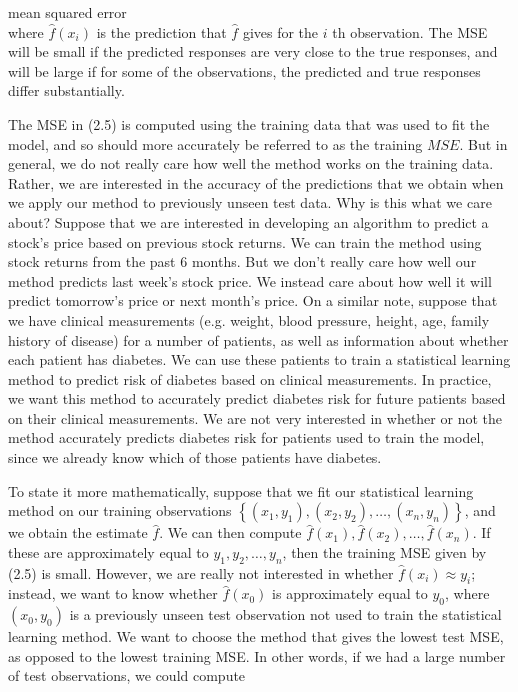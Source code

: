 \documentclass[10pt]{article}
\begin{document}
mean squared error\\
where $\hat{f}\left(x_{i}\right)$ is the prediction that $\hat{f}$ gives for the $i$ th observation. The MSE will be small if the predicted responses are very close to the true responses, and will be large if for some of the observations, the predicted and true responses differ substantially.

The MSE in (2.5) is computed using the training data that was used to fit the model, and so should more accurately be referred to as the training $M S E$. But in general, we do not really care how well the method works on the training data. Rather, we are interested in the accuracy of the predictions that we obtain when we apply our method to previously unseen test data. Why is this what we care about? Suppose that we are interested in developing an algorithm to predict a stock's price based on previous stock returns. We can train the method using stock returns from the past 6 months. But we don't really care how well our method predicts last week's stock price. We instead care about how well it will predict tomorrow's price or next month's price. On a similar note, suppose that we have clinical measurements (e.g. weight, blood pressure, height, age, family history of disease) for a number of patients, as well as information about whether each patient has diabetes. We can use these patients to train a statistical learning method to predict risk of diabetes based on clinical measurements. In practice, we want this method to accurately predict diabetes risk for future patients based on their clinical measurements. We are not very interested in whether or not the method accurately predicts diabetes risk for patients used to train the model, since we already know which of those patients have diabetes.

To state it more mathematically, suppose that we fit our statistical learning method on our training observations $\left\{\left(x_{1}, y_{1}\right),\left(x_{2}, y_{2}\right), \ldots,\left(x_{n}, y_{n}\right)\right\}$, and we obtain the estimate $\hat{f}$. We can then compute $\hat{f}\left(x_{1}\right), \hat{f}\left(x_{2}\right), \ldots, \hat{f}\left(x_{n}\right)$. If these are approximately equal to $y_{1}, y_{2}, \ldots, y_{n}$, then the training MSE given by (2.5) is small. However, we are really not interested in whether $\hat{f}\left(x_{i}\right) \approx y_{i}$; instead, we want to know whether $\hat{f}\left(x_{0}\right)$ is approximately equal to $y_{0}$, where $\left(x_{0}, y_{0}\right)$ is a previously unseen test observation not used to train the statistical learning method. We want to choose the method that gives the lowest test MSE, as opposed to the lowest training MSE. In other words, if we had a large number of test observations, we could compute
\end{document}
